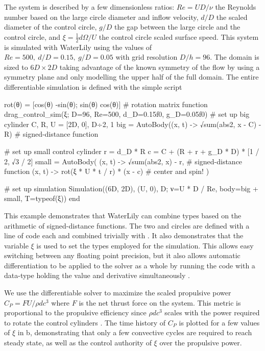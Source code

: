 \documentclass[10pt,a4paper]{article}
\begin{document}
The system is described by a few dimensionless ratios: $Re=UD/\nu$ the Reynolds number based on the large circle diameter and inflow velocity, $d/D$ the scaled diameter of the control circle, $g/D$ the gap between the large circle and the control circle, and $\xi=\frac 12 d\Omega/U$ the control circle scaled surface speed. This system is simulated with WaterLily using the values of $Re=500,\ d/D=0.15,\ g/D=0.05$ with grid resolution $D/h=96$. The domain is sized to $6D\times2D$ taking advantage of the known symmetry of the flow by using a symmetry plane and only modelling the upper half of the full domain. The entire differentiable simulation is defined with the simple script

\begin{minipage}{\linewidth}\noindent
\begin{jllisting}
rot(θ) = [cos(θ) -sin(θ); sin(θ) cos(θ)] # rotation matrix
function drag_control_sim(ξ; D=96, Re=500, d_D=0.15f0, g_D=0.05f0)
    # set up big cylinder
    C, R, U = [2D, 0], D÷2, 1
    big = AutoBody((x, t) -> √sum(abs2, x - C) - R) # signed-distance function

    # set up small control cylinder
    r = d_D * R
    c = C + (R + r + g_D * D) * [1 / 2, √3 / 2]
    small = AutoBody(
        (x, t) -> √sum(abs2, x) - r,           # signed-distance function
        (x, t) -> rot(ξ * U * t / r) * (x - c) # center and spin!
    )

    # set up simulation
    Simulation((6D, 2D), (U, 0), D; ν=U * D / Re, body=big + small, T=typeof(ξ))
end
\end{jllisting}
\end{minipage}

This example demonstrates that WaterLily can combine  types based on the arithmetic of signed-distance functions. The two  and  circles are defined with a line of code each and combined trivially with . It also demonstrates that the variable $\xi$ is used to set the types employed for the simulation. This allows easy switching between any floating point precision, but it also allows automatic differentiation to be applied to the solver as a whole by running the code with a  data-type holding the value and derivative simultaneously \citep{RevelsLubinPapamarkou2016}.

We use the differentiable solver to maximize the scaled propulsive power $C_P = FU/\rho dc^3$ where $F$ is the net thrust force on the system. This metric is  proportional to the propulsive efficiency since $\rho dc^3$ scales with the power required to rotate the control cylinders \citep{schulmeister2017}. The time history of $C_P$ is plotted for a few values of $\xi$ in b, demonstrating that only a few convective cycles are required to reach steady state, as well as the control authority of $\xi$ over the propulsive power.
\end{document}
